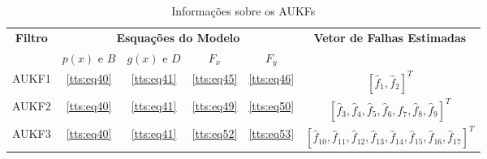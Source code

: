 \begin{table}[H]
\begin{spacing}{1.5}
\centering
\caption{Informações sobre os AUKFs}
\label{tab:descricao_aukf}
\begin{tabular}{|c|c|c|c|c|c|}
\hline
\multirow{2}{*}{\textbf{Filtro}} & \multicolumn{4}{c|}{\textbf{Esquações do Modelo}} & \multirow{2}{*}{\textbf{Vetor de Falhas Estimadas}} \\ \cline{2-5}
      & $p(x)$ e $B$ & $g(x)$ e $D$ & $F_{x}$ & $F_{y}$ &                            \\ \hline
AUKF1 & \eqref{tts:eq40} & \eqref{tts:eq41} & \eqref{tts:eq45} & \eqref{tts:eq46} & $[\hat{f}_{1} , \hat{f}_{2}]^T$ \\ \hline
AUKF2 & \eqref{tts:eq40} & \eqref{tts:eq41} & \eqref{tts:eq49} & \eqref{tts:eq50} & $[\hat{f}_{3},\hat{f}_{4},\hat{f}_{5},\hat{f}_{6},\hat{f}_{7},\hat{f}_{8},\hat{f}_{9}]^T$ \\ \hline
AUKF3 & \eqref{tts:eq40} & \eqref{tts:eq41} & \eqref{tts:eq52} & \eqref{tts:eq53} &  $[\hat{f}_{10},\hat{f}_{11},\hat{f}_{12},\hat{f}_{13},\hat{f}_{14},\hat{f}_{15},\hat{f}_{16},\hat{f}_{17}]^T$ \\ \hline
\end{tabular}
\end{spacing}
\end{table}
